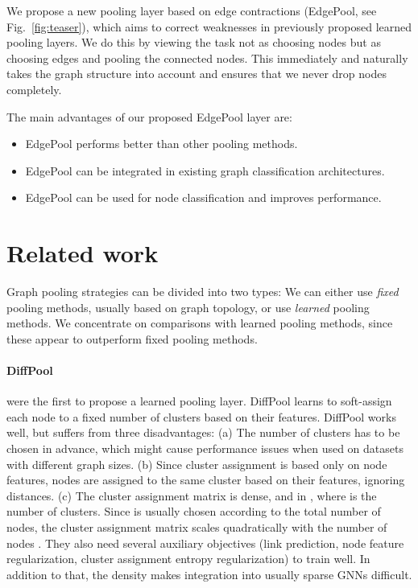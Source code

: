 \documentclass{article}
\newcommand{\figref}[1]{Fig.~\ref{#1}}
\newcommand{\edgepool}{EdgePool}
\begin{document}
We propose a new pooling layer based on edge contractions (\edgepool{}, see \figref{fig:teaser}), which aims to correct weaknesses in previously proposed learned pooling layers. We do this by viewing the task not as choosing nodes but as choosing edges and pooling the connected nodes. This immediately and naturally takes the graph structure into account and ensures that we never drop nodes completely.

The main advantages of our proposed \edgepool{} layer are:

\begin{itemize}
	\item \edgepool{} performs better than other pooling methods.
	\item \edgepool{} can be integrated in existing graph classification architectures.
	\item \edgepool{} can be used for node classification and improves performance.
\end{itemize} 
\section{Related work}

Graph pooling strategies can be divided into two types: We can either use \textit{fixed} pooling methods, usually based on graph topology, or use \textit{learned} pooling methods. We concentrate on comparisons with learned pooling methods, since these appear to outperform fixed pooling methods.

\paragraph{DiffPool} \citet{yingHierarchicalGraphRepresentation2018} were the first to propose a learned pooling layer. DiffPool learns to soft-assign each node to a fixed number of clusters based on their features. DiffPool works well, but suffers from three disadvantages: (a) The number of clusters has to be chosen in advance, which might cause performance issues when used on datasets with different graph sizes. (b) Since cluster assignment is based only on node features, nodes are assigned to the same cluster based on their features, ignoring distances. (c) The cluster assignment matrix is dense, and in , where  is the number of clusters. Since  is usually chosen according to the total number of nodes, the cluster assignment matrix scales quadratically with the number of nodes . They also need several auxiliary objectives (link prediction, node feature  regularization, cluster assignment entropy regularization) to train well. In addition to that, the density makes integration into usually sparse \glspl{GNN} difficult.
\end{document}

